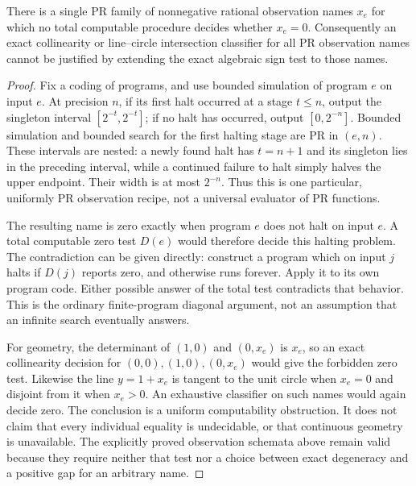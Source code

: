 \begin{proposition}
\label{lim:equality-boundary}
There is a single PR family of nonnegative rational observation names
$x_e$ for which no total computable procedure decides whether $x_e=0$.
Consequently an exact collinearity or line--circle intersection classifier
for all PR observation names cannot be justified by extending the exact
algebraic sign test to those names.
\end{proposition}
\begin{proof}
Fix a coding of programs, and use bounded simulation of program $e$ on
input $e$. At precision $n$, if its first halt occurred at a stage
$t\le n$, output the singleton interval $[2^{-t},2^{-t}]$;
if no halt has occurred, output $[0,2^{-n}]$.
Bounded simulation and bounded search for the first halting stage are
PR in $(e,n)$. These intervals are nested: a newly found halt has
$t=n+1$ and its singleton lies in the preceding interval, while a
continued failure to halt simply halves the upper endpoint. Their
width is at most $2^{-n}$. Thus this is one particular, uniformly PR
observation recipe, not a universal evaluator of PR functions.

The resulting name is zero exactly when program $e$ does not halt on
input $e$. A total computable zero test $D(e)$ would therefore decide
this halting problem. The contradiction can be given directly:
construct a program which on input $j$ halts if $D(j)$ reports zero,
and otherwise runs forever. Apply it to its own program code.
Either possible answer of the total test contradicts that behavior.
This is the ordinary finite-program diagonal argument, not an assumption
that an infinite search eventually answers.

For geometry, the determinant of $(1,0)$ and $(0,x_e)$ is $x_e$, so an
exact collinearity decision for $(0,0),(1,0),(0,x_e)$ would give the
forbidden zero test. Likewise the line $y=1+x_e$ is tangent to
the unit circle when $x_e=0$ and disjoint from it when $x_e>0$.
An exhaustive classifier on such names would again decide zero.
The conclusion is a uniform computability obstruction. It does not
claim that every individual equality is undecidable, or that continuous
geometry is unavailable. The explicitly proved observation schemata
above remain valid because they require neither that test nor a choice
between exact degeneracy and a positive gap for an arbitrary name.
\end{proof}
